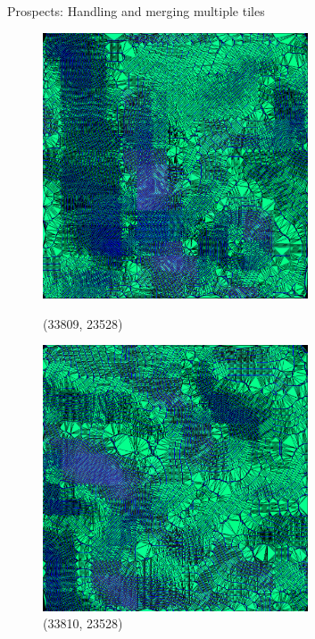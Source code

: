 \documentclass[10pt]{beamer}
\begin{document}
\begin{frame}{Prospects: Handling and merging multiple tiles}
  \begin{figure}[H]
    \centering
    \begin{minipage}{0.4\textwidth}
      \centering
      \includegraphics[width=0.7\textwidth]{images/3.png}
      \caption{(33809, 23528)}
    \end{minipage}
    \begin{minipage}{0.4\textwidth}
      \centering
      \includegraphics[width=0.7\textwidth]{images/4.png}
      \caption{(33810, 23528)}
    \end{minipage}
  \end{figure}
\end{frame}
\end{document}
